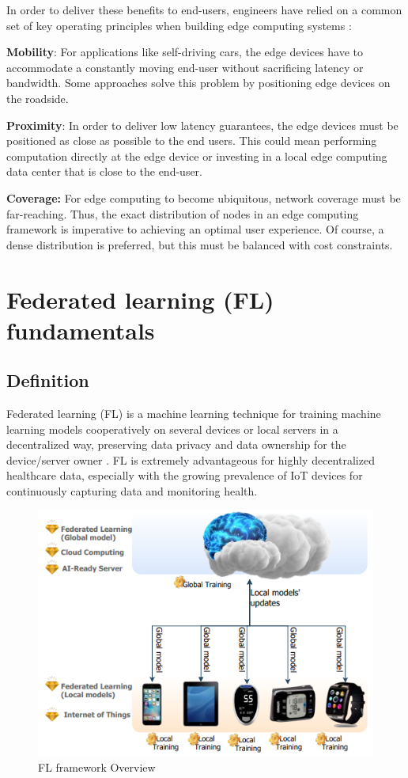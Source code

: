 In order to deliver these benefits to end-users, engineers have relied on a common set of key operating principles when building edge computing systems \cite{khan2019edge}:

\textbf{Mobility}: For applications like self-driving cars, the edge devices have to accommodate a constantly moving end-user without sacrificing latency or bandwidth. Some approaches solve this problem by positioning edge devices on the roadside.


\textbf{Proximity}: In order to deliver low latency guarantees, the edge devices must be positioned as close as possible to the end users. This could mean performing computation directly at the edge device or investing in a local edge computing data center that is close to the end-user.

\textbf{Coverage:} For edge computing to become ubiquitous, network coverage must be far-reaching. Thus, the exact distribution of nodes in an edge computing framework is imperative to achieving an optimal user experience. Of course, a dense distribution is preferred, but this must be balanced with cost constraints.



\section{Federated learning (FL) fundamentals} \label{4fedlea}

\subsection{Definition}
Federated learning (FL) is a machine learning technique for training machine learning models cooperatively on several devices or local servers in a decentralized way, preserving data privacy and data ownership for the device/server owner \cite{fl8}. FL is extremely advantageous for highly decentralized healthcare data, especially with the growing prevalence of IoT devices for continuously capturing data and monitoring health.


\begin{figure}[H]
\centering
\includegraphics[scale=0.6]{img/fl_overview.png}
\caption{FL framework Overview}
\label{fig:fl_overview}
\end{figure}

